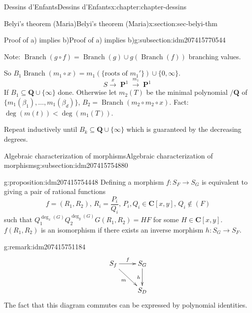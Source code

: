 \documentclass[oneside,10pt,]{book}
\numberwithin{equation}{section}
\newcommand{\lb}{[}
\newcommand{\rb}{]}
\newcommand{\QQ}{\mathbf{Q}}
\newcommand{\CC}{\mathbf{C}}
\DeclareMathOperator{\PP}{\mathbf{P}}
\newcommand{\lt}{<}
\begin{document}
\begin{chapterptx}{Dessins d'Enfants}{}{Dessins d'Enfants}{}{}{x:chapter:chapter-dessins}
\begin{sectionptx}{Belyi's theorem (Maria)}{}{Belyi's theorem (Maria)}{}{}{x:section:sec-belyi-thm}
\begin{subsectionptx}{Proof of a) implies b)}{}{Proof of a) implies b)}{}{}{g:subsection:idm207415770544}
\par
Note: \(\operatorname{Branch}(g\circ f) = \operatorname{Branch}(g) \cup g(\operatorname{Branch}(f))\) branching values.%
\par
So \(B_1 \operatorname{Branch}(m_1 \circ x) = m_1(\{\text{roots of }m_1'\}) \cup\{0,\infty\}\).%
\begin{equation*}
S\xrightarrow x \PP^1 \xrightarrow{m_1} \PP^1
\end{equation*}
If \(B_1 \subseteq \QQ \cup \{\infty\}\) done. Otherwise let \(m_2(T) \) be the minimal polynomial \(/\QQ\) of \(\{m_1(\beta_1) ,\ldots, m_1(\beta_d) \}\), \(B_2 = \operatorname{Branch}(m_2\circ m_2 \circ x)\). Fact: \(\deg(m(t)) \lt \deg(m_1(T))\).%
\par
Repeat inductively until \(B_k \subseteq \QQ \cup \{\infty\}\) which is guaranteed by the decreasing degrees.%
\end{subsectionptx}
%
%
\typeout{************************************************}
\typeout{************************************************}
%
\begin{subsectionptx}{Algebraic characterization of morphisms}{}{Algebraic characterization of morphisms}{}{}{g:subsection:idm207415754880}
\begin{proposition}{}{}{g:proposition:idm207415754448}%
Defining a morphism \(f \colon S_F\to S_G\) is equivalent to giving a pair of rational functions%
\begin{equation*}
f=  (R_1, R_2),\,R_i= \frac{P_i}{Q_i},\,    P_i,Q_i\in \CC[x,y],\,Q_i\not\in (F)
\end{equation*}
such that \(Q_1^{\deg_x(G)}Q_2^{\deg_y(G)} G(R_1, R_2) = HF\) for some \(H \in \CC\lb x, y\rb\). \(f(R_1, R_2)\) is an isomorphism if there exists an inverse morphism \(h\colon S_G\to S_F\).%
\end{proposition}
\begin{remark}{}{g:remark:idm207415751184}%
%
\begin{equation*}
\xymatrix{
S_f \ar[r]^f \ar[dr]_m & S_G \ar[d]_h \\
& S_D
}
\end{equation*}
The fact that this diagram commutes can be expressed by polynomial identities.%
\end{remark}
\end{subsectionptx}
%
%
\typeout{************************************************}
\typeout{************************************************}

\end{sectionptx}
\end{chapterptx}
\end{document}
